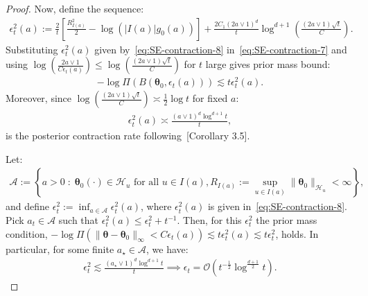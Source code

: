 \documentclass[final,12pt]{colt2026} %
\begin{document}
\begin{proof}
Now, define the sequence:
\begin{align}
\label{eq:SE-contraction-8}
\epsilon_t^{2}(a) := \frac{2}{t}\left[\frac{R^{2}_{I(a)}}{2} - \log(|I(a)|g_0(a))\right] + \frac{2C_1(2a\vee 1)^{d}}{t}\log^{d+1}\left(\frac{(2a\vee 1)\sqrt{t}}{C}\right).
\end{align}
Substituting $\epsilon_t^{2}(a)$ given by~\eqref{eq:SE-contraction-8} in~\eqref{eq:SE-contraction-7} and using $\log\left(\frac{2a\vee 1}{C\epsilon_t(a)}\right) \leq \log\left(\frac{(2a\vee 1)\sqrt{t}}{C}\right)$ for $t$ large gives prior mass bound:
\begin{align*}
-\log \Pi(B(\pmb\theta_0, \epsilon_t(a))) \lesssim t\epsilon_t^2(a).
\end{align*}
Moreover, since $\log\left(\frac{(2a\vee 1)\sqrt{t}}{C}\right) \asymp \frac{1}{2}\log t$ for fixed $a$:
\begin{align*}
    \epsilon_t^{2}(a) \asymp \frac{(a\vee 1)^d \log^{d+1}t}{t},
\end{align*}
is the posterior contraction rate following~\cite{bhattacharya2019bayesian}[Corollary 3.5].

Let: 
\begin{align*}
    \mathcal{A} := \left\{a>0\;:\;\pmb\theta_0(\cdot)\in \mathcal{H}_u\text{ for all }u\in I(a), R_{I(a)}:=\sup_{u\in I(a)}\lVert\pmb\theta_0\rVert_{\mathcal{H}_{u}} < \infty\right\},
\end{align*}
and define $\epsilon_t^2:= \inf_{a\in \mathcal{A}}\epsilon_t^{2}(a)$, where $\epsilon_t^{2}(a)$ is given in~\eqref{eq:SE-contraction-8}. Pick $a_t\in \mathcal{A}$ such that $\epsilon_t^{2}(a) \leq \epsilon_t^{2} + t^{-1}$. Then, for this $\epsilon_t^{2}$ the prior mass condition, $-\log \Pi(\lVert \pmb\theta-\pmb\theta_0\rVert_{\infty} < C\epsilon_t(a)) \lesssim t\epsilon_t^{2}(a) \lesssim t\epsilon_t^{2}$, holds. In particular, for some finite $a_{\star}\in \mathcal{A}$, we have:
\begin{align}
\label{eq:SE-contraction-9}
\epsilon_t^{2} \lesssim \frac{(a_{\star}\vee 1)^d\log^{d+1}t}{t} \implies \epsilon_t = \mathcal{O}\left(t^{-\frac{1}{2}}\log^{\frac{d+1}{2}}t\right).
\end{align}
\end{proof}
\end{document}
